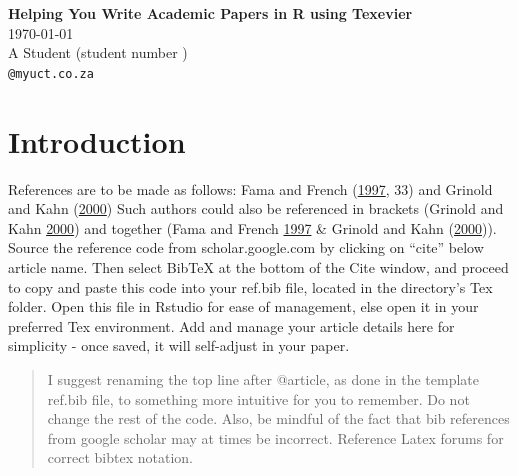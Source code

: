 \documentclass[12pt,a4paper]{article}
\numberwithin{equation}{section}
\numberwithin{figure}{section}
\numberwithin{table}{section}
\begin{document}
\begin{titlepage}

\begin{center}
{\Huge \bf Helping You Write Academic Papers in R using Texevier}\\
\today\\
A Student (student number )\\
{\tt @myuct.co.za}
\end{center}

\begin{abstract}
Abstract to be written here. The abstract should not be too long and
should provide the reader with a good understanding what you are writing
about. Academic papers are not like novels where you keep the reader in
suspense. To be effective in getting others to read your paper, be as
open and concise about your findings here as possible. Ideally, upon
reading your abstract, the reader should feel he / she must read your
paper in entirety.
\noindent
Keywords: literature, methodology, research,   results, structure, template.
\end{abstract}
\end{titlepage}


\section{\texorpdfstring{Introduction
\label{Introduction}}{Introduction }}\label{introduction}

References are to be made as follows: Fama and French
(\protect\hyperlink{ref-fama1997}{1997}, 33) and Grinold and Kahn
(\protect\hyperlink{ref-grinold2000}{2000}) Such authors could also be
referenced in brackets (Grinold and Kahn
\protect\hyperlink{ref-grinold2000}{2000}) and together (Fama and French
\protect\hyperlink{ref-fama1997}{1997} \& Grinold and Kahn
(\protect\hyperlink{ref-grinold2000}{2000})). Source the reference code
from scholar.google.com by clicking on ``cite'' below article name. Then
select BibTeX at the bottom of the Cite window, and proceed to copy and
paste this code into your ref.bib file, located in the directory's Tex
folder. Open this file in Rstudio for ease of management, else open it
in your preferred Tex environment. Add and manage your article details
here for simplicity - once saved, it will self-adjust in your paper.

\begin{quote}
I suggest renaming the top line after @article, as done in the template
ref.bib file, to something more intuitive for you to remember. Do not
change the rest of the code. Also, be mindful of the fact that bib
references from google scholar may at times be incorrect. Reference
Latex forums for correct bibtex notation.
\end{quote}
\end{document}
